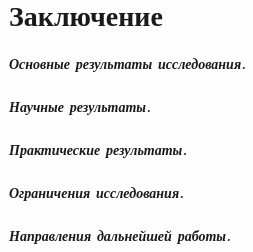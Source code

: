 \chapter*{Заключение}

\paragraph*{Основные результаты исследования.}

\paragraph*{Научные результаты.}

\paragraph*{Практические результаты.}

\paragraph*{Ограничения исследования.}

\paragraph*{Направления дальнейшей работы.}
